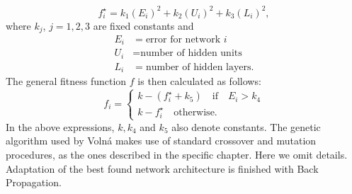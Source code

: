 \documentclass[%
    corpo=11pt,
    twoside,
    stile=classica,
    oldstyle,
    autoretitolo,
    tipotesi=magistrale,
    greek,
    evenboxes,
    english
]{toptesi}
\begin{document}
\begin{equation}
f_i^{\star} = k_1(E_i)^2 + k_2(U_i)^2 + k_3(L_i)^2,
\end{equation}
where $k_j$, $j = 1,2,3$ are fixed constants and
\begin{align*}
    E_i &= \text{error for network }i\\
    U_i &= \text{number of hidden units}\\
  	L_i &= \text{number of hidden layers}.
\end{align*}
The general fitness function  $f$ is then calculated as follows:
$$
f_i = \begin{cases}
k - (f_i^{\star} + k_5) \quad \text{if} \quad E_i > k_4 \\
k - f_i^{\star} \quad \text{otherwise.}
\end{cases} 
$$ 
In the above expressions, $k, k_4$ and $k_5$ also denote constants.
The genetic algorithm used by Volná makes use of standard crossover and mutation procedures, as the ones described in the specific chapter. Here we omit details. \\
Adaptation of the best found network architecture is finished with Back Propagation.
\end{document}
